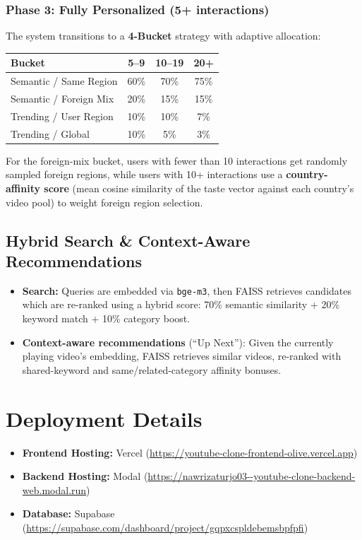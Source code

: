 \documentclass[11pt, a4paper]{report}
\begin{document}
\subsubsection{Phase 3: Fully Personalized (5+ interactions)}
The system transitions to a \textbf{4-Bucket} strategy with adaptive allocation:

\begin{center}
\renewcommand{\arraystretch}{1.2}
\begin{tabular}{l c c c}
    \toprule
    \textbf{Bucket} & \textbf{5--9} & \textbf{10--19} & \textbf{20+} \\
    \midrule
    Semantic / Same Region  & 60\% & 70\% & 75\% \\
    Semantic / Foreign Mix   & 20\% & 15\% & 15\% \\
    Trending / User Region   & 10\% & 10\% & 7\%  \\
    Trending / Global        & 10\% & 5\%  & 3\%  \\
    \bottomrule
\end{tabular}
\end{center}

For the foreign-mix bucket, users with fewer than 10 interactions get randomly sampled foreign regions, while users with 10+ interactions use a \textbf{country-affinity score} (mean cosine similarity of the taste vector against each country's video pool) to weight foreign region selection.

\subsection{Hybrid Search \& Context-Aware Recommendations}
\begin{itemize}
    \item \textbf{Search:} Queries are embedded via \texttt{bge-m3}, then FAISS retrieves candidates which are re-ranked using a hybrid score: 70\% semantic similarity + 20\% keyword match + 10\% category boost.
    \item \textbf{Context-aware recommendations} (``Up Next''): Given the currently playing video's embedding, FAISS retrieves similar videos, re-ranked with shared-keyword and same/related-category affinity bonuses.
\end{itemize}

\section{Deployment Details}
\begin{itemize}
    \item \textbf{Frontend Hosting:} Vercel (\url{https://youtube-clone-frontend-olive.vercel.app})
    \item \textbf{Backend Hosting:} Modal (\url{https://nawrizaturjo03--youtube-clone-backend-web.modal.run})
    \item \textbf{Database:} Supabase (\url{https://supabase.com/dashboard/project/gqpxcspldebemsbpfpfi})
\end{itemize}
\end{document}
